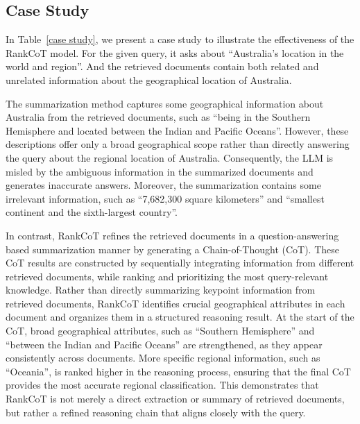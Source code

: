 



\subsection{Case Study}\label{appendix:casestudy}
In Table~\ref{case study}, we present a case study to illustrate the effectiveness of the RankCoT model. For the given query, it asks about ``Australia's location in the world and region''. And the retrieved documents contain both related and unrelated information about the geographical location of Australia.


The summarization method captures some geographical information about Australia from the retrieved documents, such as ``being in the Southern Hemisphere and located between the Indian and Pacific Oceans''. However, these descriptions offer only a broad geographical scope rather than directly answering the query about the regional location of Australia. Consequently, the LLM is misled by the ambiguous information in the summarized documents and generates inaccurate answers. Moreover, the summarization contains some irrelevant information, such as ``7,682,300 square kilometers'' and ``smallest continent and the sixth-largest country''. 

In contrast, RankCoT refines the retrieved documents in a question-answering based summarization manner by generating a Chain-of-Thought (CoT). These CoT results are constructed by sequentially integrating information from different retrieved documents, while ranking and prioritizing the most query-relevant knowledge. Rather than directly summarizing keypoint information from retrieved documents, RankCoT identifies crucial geographical attributes in each document and organizes them in a structured reasoning result. At the start of the CoT, broad geographical attributes, such as ``Southern Hemisphere'' and ``between the Indian and Pacific Oceans'' are strengthened, as they appear consistently across documents. More specific regional information, such as ``Oceania'', is ranked higher in the reasoning process, ensuring that the final CoT provides the most accurate regional classification. This demonstrates that RankCoT is not merely a direct extraction or summary of retrieved documents, but rather a refined reasoning chain that aligns closely with the query.







